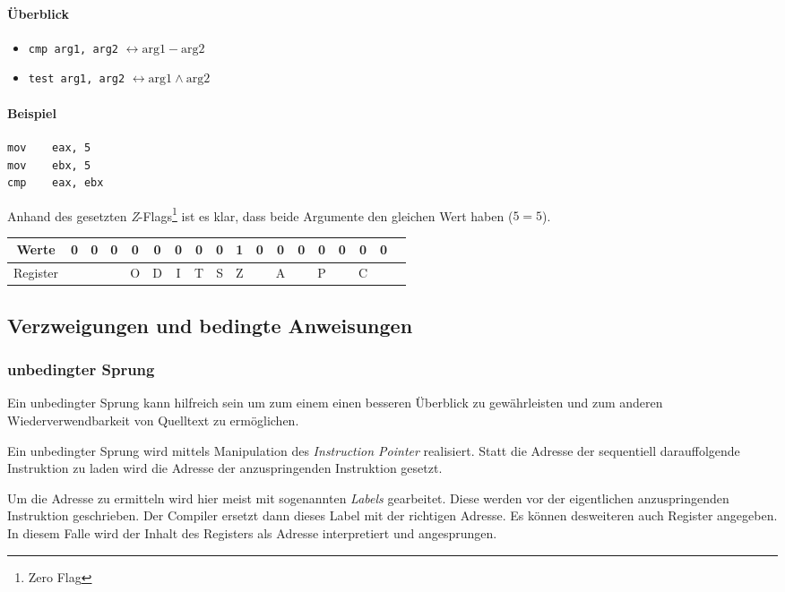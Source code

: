 \paragraph{Überblick}
\begin{itemize}
	\item \texttt{cmp arg1, arg2} $\leftrightarrow \text{arg1} - \text{arg2}$

	\item \texttt{test arg1, arg2} $\leftrightarrow \text{arg1} \wedge \text{arg2}$
\end{itemize}

\paragraph{Beispiel\newline}
\makebox{}
\begin{lstlisting}
mov    eax, 5
mov    ebx, 5
cmp    eax, ebx
\end{lstlisting}

Anhand des gesetzten \textit{Z}-Flags\footnote{Zero Flag} ist es klar, dass beide Argumente den gleichen Wert haben ($5 = 5$). 

\begin{tabular}{|c|c|c|c|c|c|c|c|c|c|c|c|c|c|c|c|c|c|}
\hline Werte & 0 & 0 & 0 & 0 & 0 & 0 & 0 & 0 & 1 & 0 & 0 & 0 & 0 & 0 & 0 & 0 \\
\hline Register & & & & O & D & I & T & S & Z & & A & & P & & C & \\
\hline
\end{tabular}

\subsection{Verzweigungen und bedingte Anweisungen}

\subsubsection{unbedingter Sprung}
Ein unbedingter Sprung kann hilfreich sein um zum einem einen besseren Überblick zu gewährleisten und zum anderen Wiederverwendbarkeit von Quelltext zu ermöglichen.

Ein unbedingter Sprung wird mittels Manipulation des \textit{Instruction Pointer} realisiert.
Statt die Adresse der sequentiell darauffolgende Instruktion zu laden wird die Adresse der anzuspringenden Instruktion gesetzt.

Um die Adresse zu ermitteln wird hier meist mit sogenannten \textit{Labels} gearbeitet. Diese werden vor der eigentlichen anzuspringenden Instruktion geschrieben. Der Compiler ersetzt dann dieses Label mit der richtigen Adresse. Es können desweiteren auch Register angegeben. In diesem Falle wird der Inhalt des Registers als Adresse interpretiert und angesprungen.


